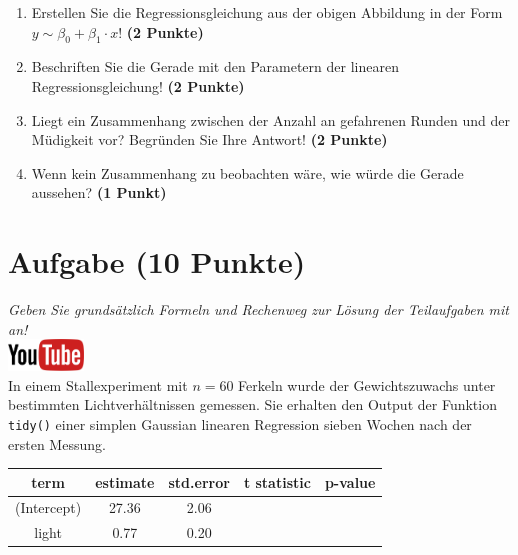 \documentclass[a4paper, 10pt]{scrartcl}\usepackage[]{graphicx}\usepackage[]{xcolor}
\begin{document}
\begin{enumerate}
\item Erstellen Sie die Regressionsgleichung aus der obigen Abbildung in
  der Form $y \sim \beta_0 + \beta_1 \cdot x$! \textbf{(2 Punkte)}
\item Beschriften Sie die Gerade mit den Parametern der linearen
  Regressionsgleichung! \textbf{(2 Punkte)}
\item Liegt ein Zusammenhang zwischen der Anzahl an gefahrenen Runden und
  der M{\"u}digkeit vor? Begr{\"u}nden Sie Ihre Antwort! \textbf{(2 Punkte)}
\item Wenn kein Zusammenhang zu beobachten w{\"a}re, wie w{\"u}rde die Gerade aussehen? \textbf{(1 Punkt)}
\end{enumerate} 
\clearpage

\section{Aufgabe \hfill (10 Punkte)}

\textit{Geben Sie grunds{\"a}tzlich Formeln und Rechenweg zur L{\"o}sung der
  Teilaufgaben mit an!} \\[1Ex]

\hfill\href{https://youtu.be/lJp8rFmMnrs}{\includegraphics[width =
  2cm]{img/youtube}}\\[1Ex]



In einem Stallexperiment mit $n = 60$ Ferkeln wurde der
Gewichtszuwachs unter bestimmten Lichtverh{\"a}ltnissen gemessen. Sie erhalten
den \Rlogo Output der Funktion \texttt{tidy()} einer simplen Gaussian linearen
Regression sieben Wochen nach der ersten Messung.

\begin{table}[!h]
\centering\begingroup\fontsize{14}{16}\selectfont

\begin{tabular}{ccccc}
\toprule
term & estimate & std.error & t statistic & p-value\\
\midrule
(Intercept) & 27.36 & 2.06 &  & \\
light & 0.77 & 0.20 &  & \\
\bottomrule
\end{tabular}
\endgroup{}
\end{table}
\end{document}
